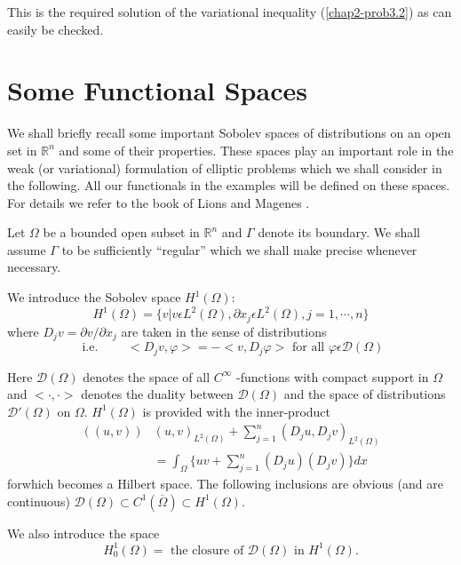 This is the required solution of the variational inequality (\ref{chap2-prob3.2}) as can easily be checked.

\section{Some Functional Spaces}\label{chap2-sec4}
We shall briefly recall some important Sobolev spaces of distributions on an open set in $\mathbb{R}^{n}$ and some of their properties. These spaces play an important role in the weak (or variational) formulation of elliptic problems which we shall consider in the following. All our functionals in the examples will be defined on these spaces. For details we refer to the book of Lions and Magenes \cite{key32}.

Let $\Omega$ be a bounded open subset in $\mathbb{R}^{n}$ and $\Gamma$ denote its boundary. We shall assume $\Gamma$ to be sufficiently ``regular'' which we shall make precise whenever necessary.

\medskip
{} We introduce the Sobolev space $H^{1} (\Omega)$:
\begin{equation*}
H^{1} (\Omega) = \{v | v \epsilon L^{2} (\Omega), \partial x_{j} \epsilon L^{2} (\Omega), j=1, \cdots, n\}\tag{4.1}\label{chap2-eq4.1}
\end{equation*}
where $D_{j}v = \partial v/\partial x_{j}$ are taken in the sense of distributions
$$
\text{ i.e. }\qquad <D_{j} v, \varphi> = -<v, D_{j} \varphi> \text{ for all } \varphi \epsilon \mathscr{D} (\Omega)
$$

Here $\mathscr{D} (\Omega)$ denotes the space of all $C^{\infty}$ -functions with compact support in $\Omega$ and $<\cdot , \cdot>$ denotes the duality between $\mathscr{D} (\Omega)$ and the space of distributions $\mathscr{D}' (\Omega)$ on $\Omega$. $H^{1} (\Omega)$ is provided with the inner-product
\begin{align*}
((u, v)) & (u, v)_{L^{2} (\Omega)} + \sum_{j=1}^{n} (D_{j} u, D_{j} v)_{L^{2} (\Omega)}\tag{4.2}\label{chap2-eq4.2}\\
& = \int_{\Omega} \{uv + \sum_{j=1}^{n} (D_{j} u)(D_{j} v)\} dx
\end{align*}
for\pageoriginale which becomes a Hilbert space. The following inclusions are obvious (and are continuous) $\mathscr{D} (\Omega) \subset C^{1} (\overline{\Omega}) \subset H^{1} (\Omega)$.

We also introduce the space
\begin{equation*}
H_{0}^{1} (\Omega) = \text{ the closure of } \mathscr{D} (\Omega) \text{ in } H^{1} (\Omega).\tag{4.3}\label{chap2-eq4.3}
\end{equation*}

